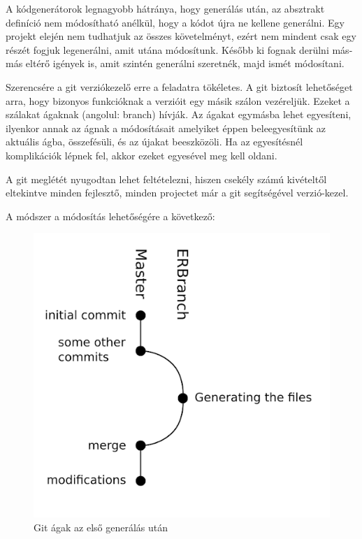 \documentclass[a4paper,12pt,oneside]{report}
\begin{document}
\begin{justify}


	A kódgenerátorok legnagyobb hátránya, hogy generálás után, az absztrakt definíció nem módosítható anélkül, hogy a kódot újra ne kellene generálni. Egy projekt elején nem tudhatjuk az összes követelményt, ezért nem mindent csak egy részét fogjuk legenerálni, amit utána módosítunk. Később ki fognak derülni más-más eltérő igények is, amit szintén generálni szeretnék, majd ismét módosítani.

	Szerencsére a git verziókezelő erre a feladatra tökéletes. A git biztosít lehetőséget arra, hogy bizonyos funkcióknak a verzióit egy másik szálon vezéreljük. Ezeket a szálakat ágaknak (angolul: branch) hívják. Az ágakat egymásba lehet egyesíteni, ilyenkor annak az ágnak a módosításait amelyiket éppen beleegyesítünk az aktuális ágba, összefésüli, és az újakat beeszközöli. Ha az egyesítésnél komplikációk lépnek fel, akkor ezeket egyesével meg kell oldani. 

	A git meglétét nyugodtan lehet feltételezni, hiszen csekély számú kivételtől eltekintve minden fejlesztő, minden projectet már a git segítségével verzió-kezel.

	A módszer a módosítás lehetőségére a következő:


	\begin{figure}[h]
		\includegraphics[width=\textwidth]{contents/images/git_first.png}
		\caption{Git ágak az első generálás után}
		\label{fig:git_first}
	\end{figure}


\end{justify}
\end{document}
